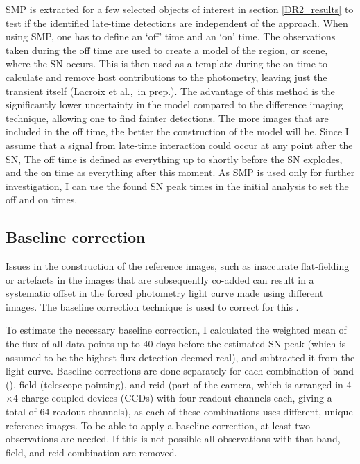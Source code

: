 \documentclass[a4paper,oneside,12pt, class=Latex/Classes/PhDthesisPSnPDF, crop=false]{standalone}
\begin{document}
SMP is extracted for a few selected objects of interest in section \ref{DR2_results} to test if the identified late-time detections are independent of the approach. When using SMP, one has to define an `off' time and an `on' time. The observations taken during the off time are used to create a model of the region, or scene, where the SN occurs. This is then used as a template during the on time to calculate and remove host contributions to the photometry, leaving just the transient itself (Lacroix et al.,~in prep.). The advantage of this method is the significantly lower uncertainty in the model compared to the difference imaging technique, allowing one to find fainter detections. The more images that are included in the off time, the better the construction of the model will be. Since I assume that a signal from late-time interaction could occur at any point after the SN, The off time is defined as everything up to shortly before the SN explodes, and the on time as everything after this moment. As SMP is used only for further investigation, I can use the found SN peak times in the initial analysis to set the off and on times.


\subsection{Baseline correction}
Issues in the construction of the reference images, such as inaccurate flat-fielding or artefacts in the images that are subsequently co-added can result in a systematic offset in the forced photometry light curve made using different images. The baseline correction technique is used to correct for this \citep{Yao_baseline_corr, Miller_baseline_corr}.

To estimate the necessary baseline correction, I calculated the weighted mean of the flux of all data points up to 40 days before the estimated SN peak (which is assumed to be the highest flux detection deemed real), and subtracted it from the light curve. Baseline corrections are done separately for each combination of band (\ztfg\ztfr\ztfi), field (telescope pointing), and rcid (part of the camera, which is arranged in 4$\times$4 charge-coupled devices (CCDs) with four readout channels each, giving a total of 64 readout channels), as each of these combinations uses different, unique reference images. To be able to apply a baseline correction, at least two observations are needed. If this is not possible all observations with that band, field, and rcid combination are removed.
\end{document}
